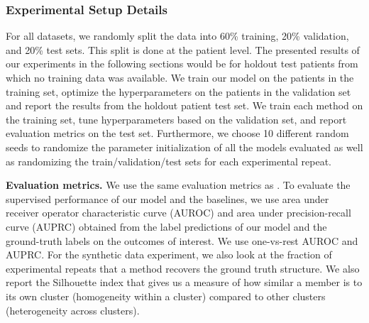\documentclass[pmlr,twocolumn,10pt]{jmlr} %
\begin{document}
\subsubsection{Experimental Setup Details}
\label{sec:ExperimentalSetup}

For all datasets, we randomly split the data into 60\% training, 20\% validation, and 20\% test sets. 
This split is done at the patient level. The presented results of our experiments in the following sections would be for holdout test patients from which no training data was available. We train our model on the patients in the training set, optimize the hyperparameters on the patients in the validation set and report the results from the holdout patient test set. 
We train each method on the training set, tune hyperparameters based on the validation set, and report evaluation metrics on the test set.
Furthermore, we choose 10 different random seeds to randomize the parameter initialization of all the models evaluated as well as randomizing the train/validation/test sets for each experimental repeat.

\vspace{.2em}
\noindent
\textbf{Evaluation metrics.}
We use the same evaluation metrics as \citet{lee2020temporal}. To evaluate the supervised performance of our model and the baselines, we use area under receiver operator characteristic curve (AUROC) and area under precision-recall curve (AUPRC) obtained from the label predictions of our model and the ground-truth labels on the outcomes of interest. We use one-vs-rest AUROC and AUPRC. For the synthetic data experiment, we also look at the fraction of experimental repeats that a method recovers the ground truth structure. We also report the Silhouette index \citep{rousseeuw1987silhouettes} that gives us a measure of how similar a member is to its own cluster (homogeneity within a cluster) compared to other clusters (heterogeneity across clusters). 
\end{document}
